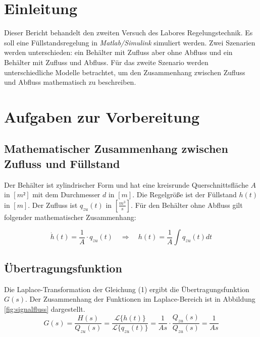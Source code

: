 \section{Einleitung}
Dieser Bericht behandelt den zweiten Versuch des Labores Regelungstechnik. Es soll eine Füllstandsregelung in \textit{Matlab/Simulink} simuliert werden. Zwei Szenarien werden unterschieden: ein Behälter mit Zufluss aber ohne Abfluss und ein Behälter mit Zufluss und Abfluss. Für das zweite Szenario werden unterschiedliche Modelle betrachtet, um den Zusammenhang zwischen Zufluss und Abfluss mathematisch zu beschreiben.

\section{Aufgaben zur Vorbereitung}
\subsection{Mathematischer Zusammenhang zwischen Zufluss und Füllstand}
Der Behälter ist zylindrischer Form und hat eine kreisrunde Querschnittsfläche $A$ in $[m²]$ mit dem Durchmesser $d$ in $[m]$. Die Regelgröße ist der Füllstand $h(t)$ in $[m]$. Der Zufluss ist $q_{zu}(t)$ in $[\frac{m^3}{s}]$.
Für den Behälter ohne Abfluss gilt folgender mathematischer Zusammenhang:

\begin{equation}
    \dot{h}(t) = \frac{1}{A} \cdot q_{zu}(t) \quad 
    \Longrightarrow 
    \quad 
    h(t) = \frac{1}{A} \int q_{zu}(t) dt
\end{equation}

\subsection{Übertragungsfunktion}
Die Laplace-Transformation der Gleichung (1) ergibt die Übertragungsfunktion $G(s)$. Der Zusammenhang der Funktionen im Laplace-Bereich ist in Abbildung \ref{fig:signalfluss} dargestellt.
\begin{equation}
    G(s) = \frac{H(s)}{Q_{zu}(s)} = \frac{\mathcal{L}\{h(t)\}}{\mathcal{L}\{q_{zu}(t)\}} = \frac{1}{As} \cdot  \frac{Q_{zu}(s)}{Q_{zu}(s)} = \frac{1}{As}
\end{equation}

